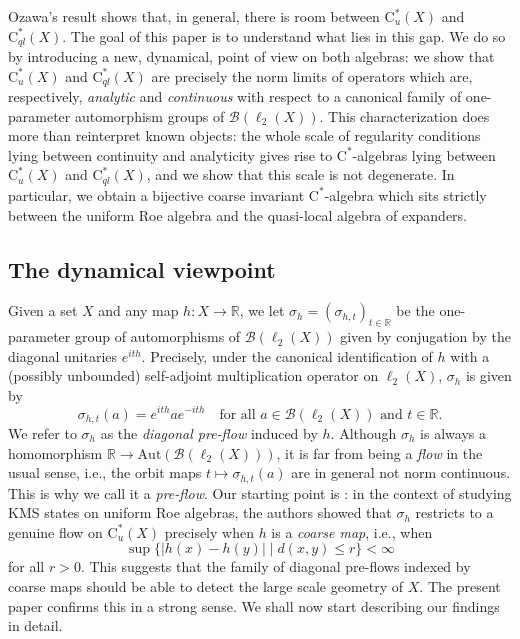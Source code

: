 \documentclass[11pt]{amsart}
\numberwithin{equation}{section}
\theoremstyle{definition}
\theoremstyle{remark}
\begin{document}
Ozawa's result shows that, in general, there is room between
$\mathrm{C}^*_u(X)$ and $\mathrm{C}^*_{ql}(X)$. The goal of this paper is to
understand what lies in this gap. We do so by introducing a new, dynamical,
point of view on both algebras: we show that $\mathrm{C}^*_u(X)$ and
$\mathrm{C}^*_{ql}(X)$ are precisely the norm limits of operators which are, respectively,
\emph{analytic} and \emph{continuous} with respect to a canonical family of
one-parameter automorphism groups of $\mathcal{B}(\ell_2(X))$. This
characterization does more than reinterpret known objects: the whole scale of
regularity conditions lying between continuity and analyticity gives rise to
$\mathrm{C}^*$-algebras lying between $\mathrm{C}^*_u(X)$ and
$\mathrm{C}^*_{ql}(X)$, and we show that this scale is not degenerate. In
particular, we obtain a bijective coarse invariant $\mathrm{C}^*$-algebra which sits
strictly between the uniform Roe algebra and the quasi-local algebra of
expanders.

\subsection{The dynamical viewpoint}
Given a set $X$ and any map $h\colon X\to\mathbb{R}$, we let $\sigma_h=(\sigma_{h,t})_{t\in\mathbb{R}}$
be the one-parameter group of automorphisms of $\mathcal{B}(\ell_2(X))$ given by
conjugation by the diagonal unitaries $e^{ith}$. Precisely, under the canonical identification of $h$ with a  (possibly unbounded) self-adjoint multiplication operator on $\ell_2(X)$, $\sigma_h$ is given by
\[
\sigma_{h,t}(a)=e^{ith}ae^{-ith}\quad\text{for all } a\in\mathcal{B}(\ell_2(X))\text{ and } t\in\mathbb{R}.
\]
 We refer to $\sigma_h$ as the \emph{diagonal pre-flow} induced by $h$. Although
$\sigma_h$ is always a homomorphism $\mathbb{R}\to\mathrm{Aut}(\mathcal{B}(\ell_2(X)))$,
it is far from being a \emph{flow} in the usual sense, i.e., the orbit maps
$t\mapsto\sigma_{h,t}(a)$ are in general not norm continuous. This is why we
call it a \emph{pre-flow}.  Our starting point is \cite[Proposition 2.1]{BragaExel2023}: in the context of studying  KMS states on uniform Roe algebras, the authors showed that
$\sigma_h$ restricts to a genuine flow on $\mathrm{C}^*_u(X)$ precisely when
$h$ is a \emph{coarse map}, i.e., when \[\sup\{|h(x)-h(y)|\mid d(x,y)\le r\}<\infty\]
for all $r>0$. This suggests that the family of diagonal pre-flows indexed by
coarse maps should be able to detect the large scale geometry of $X$. The present paper confirms this in a strong sense. We shall now start describing our findings in detail.
\end{document}
